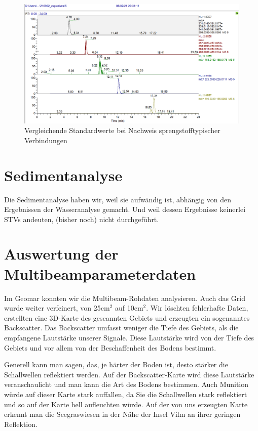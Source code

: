 \begin{figure}[htb!]
\includegraphics[height=\textheight,%
                   width=\textwidth,%
                   keepaspectratio]{Bilder/Explosives_5ppb.PNG}
\caption{Vergleichende Standardwerte bei Nachweis sprengstofftypischer Verbindungen}
\end{figure}

\section{Sedimentanalyse}
Die Sedimentanalyse haben wir, weil sie aufwändig ist, abhängig von den Ergebnissen der Wasseranalyse gemacht. Und weil dessen Ergebnisse keinerlei STVs andeuten, (bisher noch) nicht durchgeführt.

\section{Auswertung der Multibeamparameterdaten}

Im Geomar konnten wir die Multibeam-Rohdaten analysieren. Auch das Grid wurde weiter verfeinert, von 25cm$^2$ auf 10cm$^2$. 
Wir löschten fehlerhafte Daten, erstellten eine 3D-Karte des gescannten Gebiets und erzeugten ein sogenanntes \glqq Backscatter\grqq . 
Das Backscatter umfasst weniger die Tiefe des Gebiets, als die empfangene Lautstärke unserer Signale. 
Diese Lautstärke wird von der Tiefe des Gebiets und vor allem von der Beschaffenheit des Bodens bestimmt.

Generell kann man sagen, das, je härter der Boden ist, desto stärker die Schallwellen reflektiert werden. 
Auf der Backscatter-Karte wird diese Lautstärke veranschaulicht und man kann die Art des Bodens bestimmen.
Auch Munition würde auf dieser Karte stark auffallen, da Sie die Schallwellen stark reflektiert und so 
auf der Karte hell aufleuchten würde. Auf der von uns erzeugten Karte erkennt man die Seegraswiesen in der Nähe der Insel Vilm an ihrer geringen Reflektion.

